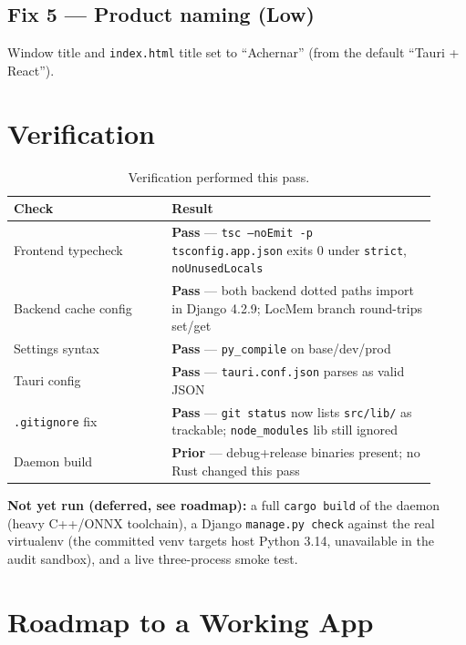 \documentclass[11pt]{article}
\newcommand{\sevl}[1]{\textbf{\textcolor{acgray}{#1}}}
\newcommand{\ok}[1]{\textbf{\textcolor{acgreen}{#1}}}
\newcommand{\fn}[1]{\texttt{#1}}
\begin{document}
\subsection{Fix 5 --- Product naming (\sevl{Low})}
Window title and \fn{index.html} title set to ``Achernar'' (from the default ``Tauri + React'').

\section{Verification}\label{sec:verify}

\begin{table}[h]
\centering
\renewcommand{\arraystretch}{1.3}
\begin{tabular}{>{\raggedright\arraybackslash}p{0.34\linewidth} >{\raggedright\arraybackslash}p{0.58\linewidth}}
\toprule
\textbf{Check} & \textbf{Result} \\
\midrule
Frontend typecheck & \ok{Pass} --- \texttt{tsc --noEmit -p tsconfig.app.json} exits 0 under \texttt{strict}, \texttt{noUnusedLocals} \\
Backend cache config & \ok{Pass} --- both backend dotted paths import in Django 4.2.9; LocMem branch round-trips set/get \\
Settings syntax & \ok{Pass} --- \texttt{py\_compile} on base/dev/prod \\
Tauri config & \ok{Pass} --- \texttt{tauri.conf.json} parses as valid JSON \\
\texttt{.gitignore} fix & \ok{Pass} --- \texttt{git status} now lists \texttt{src/lib/} as trackable; \texttt{node\_modules} lib still ignored \\
Daemon build & \ok{Prior} --- debug+release binaries present; no Rust changed this pass \\
\bottomrule
\end{tabular}
\caption{Verification performed this pass.}
\end{table}

\noindent\textbf{Not yet run (deferred, see roadmap):} a full \texttt{cargo build} of the daemon (heavy
C++/ONNX toolchain), a Django \texttt{manage.py check} against the real virtualenv (the committed venv
targets host Python 3.14, unavailable in the audit sandbox), and a live three-process smoke test.

\section{Roadmap to a Working App}
\end{document}
